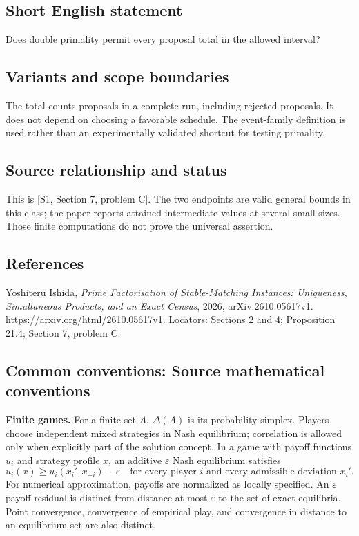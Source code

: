 \documentclass[11pt,a4paper]{article}
\begin{document}
\subsection*{Short English statement}
Does double primality permit every proposal total in the allowed interval?

\subsection*{Variants and scope boundaries}
The total counts proposals in a complete run, including rejected
proposals. It does not depend on choosing a favorable schedule.
The event-family definition is used rather than an experimentally
validated shortcut for testing primality.

\subsection*{Source relationship and status}
This is [S1, Section 7, problem C].
The two endpoints are valid general bounds in this class; the paper
reports attained intermediate values at several small sizes.
Those finite computations do not prove the universal assertion.

\subsection*{References}
\begingroup\footnotesize\raggedright
\noindent[S1] Yoshiteru Ishida,
\emph{Prime Factorisation of Stable-Matching Instances: Uniqueness,
Simultaneous Products, and an Exact Census}, 2026,
arXiv:2610.05617v1.
\url{https://arxiv.org/html/2610.05617v1}.
Locators: Sections 2 and 4; Proposition 21.4;
Section 7, problem C.
\par\endgroup

\subsection*{Common conventions: Source mathematical conventions}

\textbf{Finite games.} For a finite set $A$, $\Delta(A)$ is its probability
simplex. Players choose independent mixed strategies in Nash equilibrium;
correlation is allowed only when explicitly part of the solution concept.
In a game with payoff functions $u_i$ and strategy profile $x$, an additive
$\varepsilon$ Nash equilibrium satisfies
\[
 u_i(x)\geq u_i(x_i',x_{-i})-\varepsilon
 \quad\text{for every player $i$ and every admissible deviation $x_i'$}.
\]
For numerical approximation, payoffs are normalized as locally specified.
An $\varepsilon$ payoff residual is distinct from distance at most
$\varepsilon$ to the set of exact equilibria. Point convergence, convergence
of empirical play, and convergence in distance to an equilibrium set are
also distinct.
\end{document}
